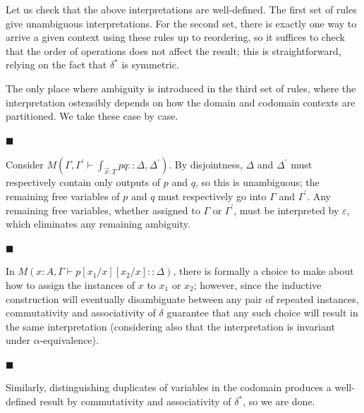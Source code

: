 Let us check that the above interpretations are well-defined. The first set of rules give unambiguous interpretations. For the second set, there is exactly one way to arrive a given context using these rules up to reordering, so it suffices to check that the order of operations does not affect the result; this is straightforward, relying on the fact that $\delta^{*}$ is symmetric.\par
 
 
 
The only place where ambiguity is introduced in the third set of rules, where the interpretation ostensibly depends on how the domain and codomain contexts are partitioned. We take these case by case.\par
  
\par\noindent  $\blacksquare$ 
 
Consider $M\left(\Gamma,\Gamma^{\prime}\vdash\int_{\vec{x}:T}pq::\Delta,\Delta^{\prime}\right)$. By disjointness, $\Delta$ and $\Delta^{\prime}$ must respectively contain only outputs of $p$ and $q$, so this is unambiguous; the remaining free variables of $p$ and $q$ must respectively go into $\Gamma$ and $\Gamma^{\prime}$. Any remaining free variables, whether assigned to $\Gamma$ or $\Gamma^{\prime}$, must be interpreted by $\varepsilon$, which eliminates any remaining ambiguity.\par
 
 
 
\par\noindent  $\blacksquare$ 
 
In $M(x:A,\Gamma\vdash p[x_{1}/x][x_{2}/x]::\Delta)$, there is formally a choice to make about how to assign the instances of $x$ to $x_{1}$ or $x_{2}$; however, since the inductive construction will eventually disambiguate between any pair of repeated instances, commutativity and associativity of $\delta$ guarantee that any such choice will result in the same interpretation (considering also that the interpretation is invariant under $\alpha$-equivalence).\par
 
 
 
\par\noindent  $\blacksquare$ 
 
Similarly, distinguishing duplicates of variables in the codomain produces a well-defined result by commutativity and associativity of $\delta^{*}$, so we are done.\par
 
